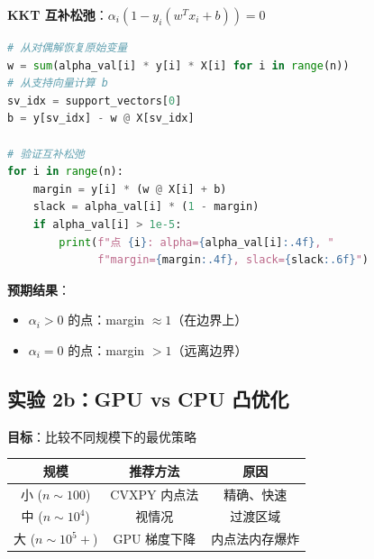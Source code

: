 \documentclass[12pt, a4paper]{ctexart}
\begin{document}
\begin{blackboard}[观察互补松弛]

\textbf{KKT 互补松弛}：$\alpha_i (1 - y_i(w^T x_i + b)) = 0$

\begin{lstlisting}[language=Python]
# 从对偶解恢复原始变量
w = sum(alpha_val[i] * y[i] * X[i] for i in range(n))
# 从支持向量计算 b
sv_idx = support_vectors[0]
b = y[sv_idx] - w @ X[sv_idx]

# 验证互补松弛
for i in range(n):
    margin = y[i] * (w @ X[i] + b)
    slack = alpha_val[i] * (1 - margin)
    if alpha_val[i] > 1e-5:
        print(f"点 {i}: alpha={alpha_val[i]:.4f}, "
              f"margin={margin:.4f}, slack={slack:.6f}")
\end{lstlisting}

\textbf{预期结果}：
\begin{itemize}
    \item $\alpha_i > 0$ 的点：margin $\approx 1$（在边界上）
    \item $\alpha_i = 0$ 的点：margin $> 1$（远离边界）
\end{itemize}

\end{blackboard}

\subsection{实验 2b：GPU vs CPU 凸优化}

\begin{experiment}[规模与方法的权衡]

\textbf{目标}：比较不同规模下的最优策略

\begin{center}
\begin{tabular}{c|c|c}
规模 & 推荐方法 & 原因 \\
\hline
小 ($n \sim 100$) & CVXPY 内点法 & 精确、快速 \\
中 ($n \sim 10^4$) & 视情况 & 过渡区域 \\
大 ($n \sim 10^5+$) & GPU 梯度下降 & 内点法内存爆炸
\end{tabular}
\end{center}

\end{experiment}
\end{document}
